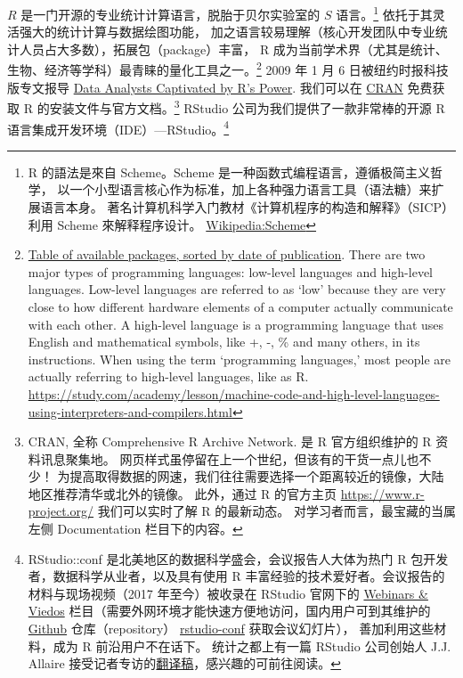 \documentclass[11pt,hyperref]{ctexart}
\begin{document}
\href{https://www.r-project.org/}{\(R\)}
是一门开源的专业统计计算语言，脱胎于贝尔实验室的 \(S\) 语言。\footnote{R
  的語法是來自 Scheme。Scheme 是一种函数式编程语言，遵循极简主义哲学，
  以一个小型语言核心作为标准，加上各种强力语言工具（语法糖）来扩展语言本身。
  著名计算机科学入门教材《计算机程序的构造和解释》（SICP）利用 Scheme
  來解释程序设计。
  \href{https://www.wikiwand.com/zh/Scheme}{Wikipedia:Scheme}}
依托于其灵活强大的统计计算与数据绘图功能，
加之语言较易理解（核心开发团队中专业统计人员占大多数），拓展包（package）丰富，
R
成为当前学术界（尤其是统计、生物、经济等学科）最青睐的量化工具之一。\footnote{\href{https://cran.r-project.org/web/packages/available_packages_by_date.html}{Table
  of available packages, sorted by date of publication}. There are two
  major types of programming languages: low-level languages and
  high-level languages. Low-level languages are referred to as `low'
  because they are very close to how different hardware elements of a
  computer actually communicate with each other. A high-level language
  is a programming language that uses English and mathematical symbols,
  like +, -, \% and many others, in its instructions. When using the
  term `programming languages,' most people are actually referring to
  high-level languages, like as R.
  \url{https://study.com/academy/lesson/machine-code-and-high-level-languages-using-interpreters-and-compilers.html}}
2009 年 1 月 6 日被纽约时报科技版专文报导
\href{https://www.nytimes.com/2009/01/07/technology/business-computing/07program.html}{Data
Analysts Captivated by R's Power}. 我们可以在
\href{https://cran.r-project.org/mirrors.html}{CRAN} 免费获取 R
的安装文件与官方文档。\footnote{CRAN, 全称 Comprehensive R Archive
  Network. 是 R 官方组织维护的 R 资料讯息聚集地。
  网页样式虽停留在上一个世纪，但该有的干货一点儿也不少！
  为提高取得数据的网速，我们往往需要选择一个距离较近的镜像，大陆地区推荐清华或北外的镜像。
  此外，通过 R 的官方主页 \url{https://www.r-project.org/}
  我们可以实时了解 R 的最新动态。 对学习者而言，最宝藏的当属左侧
  Documentation 栏目下的内容。} RStudio 公司为我们提供了一款非常棒的开源
R 语言集成开发环境（IDE）---RStudio。\footnote{RStudio::conf
  是北美地区的数据科学盛会，会议报告人大体为热门 R
  包开发者，数据科学从业者，以及具有使用 R
  丰富经验的技术爱好者。会议报告的材料与现场视频（2017 年至今）被收录在
  RStudio 官网下的
  \href{https://rstudio.com/resources/webinars/}{Webinars \& Viedos}
  栏目（需要外网环境才能快速方便地访问，国内用户可到其维护的
  \href{https://github.com/jun3970}{Github} 仓库（repository）
  \href{https://github.com/rstudio/rstudio-conf}{rstudio-conf}
  获取会议幻灯片）， 善加利用这些材料，成为 R 前沿用户不在话下。
  统计之都上有一篇 RStudio 公司创始人 J.J. Allaire
  接受记者专访的\href{https://cosx.org/2016/11/interview-j-j-allaire/}{翻译稿}，感兴趣的可前往阅读。}
\end{document}
